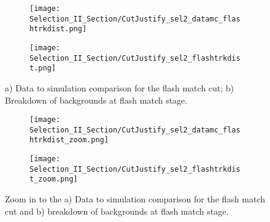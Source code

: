 \begin{figure}[h!]
\centering
  \begin{subfigure}[t]{0.4\textwidth}
    \centering
\texttt{[image: Selection\_II\_Section/CutJustify\_sel2\_datamc\_flashtrkdist.png]}
    \caption{ }
  \end{subfigure} 
  \hspace{10 mm}
  \begin{subfigure}[t]{0.4\textwidth}
    \centering
\texttt{[image: Selection\_II\_Section/CutJustify\_sel2\_flashtrkdist.png]}
    \caption{ }
  \end{subfigure} 
\caption{ a) Data to simulation comparison for the flash match cut; b) Breakdown of backgrounds at flash match stage. }
\label{fig:cutjust_sel2_flashtrkdist}
\end{figure}

\begin{figure}[h!]
\centering
  \begin{subfigure}[t]{0.4\textwidth}
    \centering
\texttt{[image: Selection\_II\_Section/CutJustify\_sel2\_datamc\_flashtrkdist\_zoom.png]}
    \caption{ }
  \end{subfigure} 
  \hspace{10 mm}
  \begin{subfigure}[t]{0.4\textwidth}
    \centering
\texttt{[image: Selection\_II\_Section/CutJustify\_sel2\_flashtrkdist\_zoom.png]}
   \caption{ }
  \end{subfigure} 
\caption{ Zoom in to the a) Data to simulation comparison for the flash match cut and b) breakdown of backgrounds at flash match stage. }
\label{fig:cutjust_sel2_flashtrkdist_zoom}
\end{figure}

